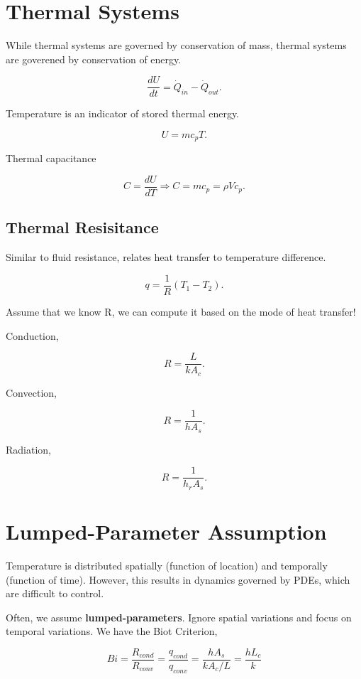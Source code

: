 \documentclass[12pt, a4paper]{report}
\begin{document}
  \section{Thermal Systems}

  While thermal systems are governed by conservation of mass, thermal systems are goverened by conservation of energy.

  \[
      \frac{dU}{dt} = \dot Q_{in} - \dot Q_{out}
    .\]

  Temperature is an indicator of stored thermal energy.

  \[
      U = mc_pT
    .\]

  Thermal capacitance

  \[
      C = \frac{dU}{dT} \Rightarrow C = mc_p = \rho V c_p
    .\]

  \subsection{Thermal Resisitance}

  Similar to fluid resistance, relates heat transfer to temperature difference.

  \[
      q = \frac{1}{R} (T_1 - T_2)
    .\]

  Assume that we know R, we can compute it based on the mode of heat transfer!

  Conduction,

  \[
      R = \frac{L}{kA_c}
    .\]

  Convection,

  \[
      R = \frac{1}{hA_s}
    .\]

  Radiation,

  \[
      R = \frac{1}{h_rA_s}
    .\]

  \section{Lumped-Parameter Assumption}

  Temperature is distributed spatially (function of location) and temporally (function of time). However, this results in dynamics governed by PDEs, which are difficult to control.

  Often, we assume \textbf{lumped-parameters}. Ignore spatial variations and focus on temporal variations. We have the Biot Criterion,

  \begin{equation}
    Bi = \frac{R_{cond}}{R_{conv}} = \frac{q_{cond}}{q_{conv}} = \frac{hA_s}{kA_c/L} = \frac{hL_c}{k}
  \end{equation}
\end{document}
